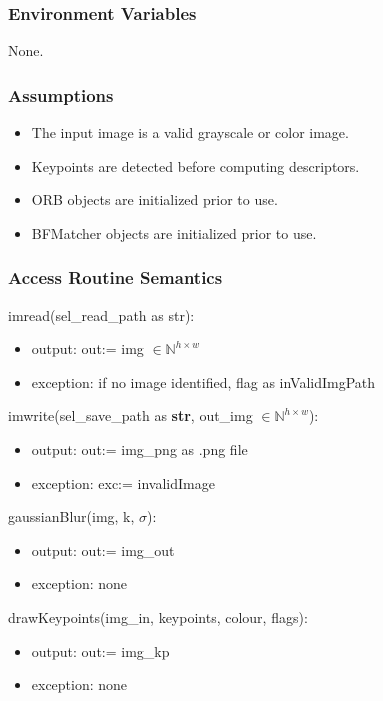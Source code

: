 \documentclass[12pt, titlepage]{article}
\begin{document}
\subsubsection{Environment Variables}
None.

\subsubsection{Assumptions}
\begin{itemize}
    \item The input image is a valid grayscale or color image.
    \item Keypoints are detected before computing descriptors.
    \item ORB objects are initialized prior to use.
    \item BFMatcher objects are initialized prior to use.
\end{itemize}

\subsubsection{Access Routine Semantics}

\noindent imread(sel\_read\_path as str):
\begin{itemize}
\item output: out:= img $\in \mathbb{N}^{h \times w}$
\item exception: if no image identified, flag as inValidImgPath 
\end{itemize}

\noindent imwrite(sel\_save\_path as \textbf{str}, out\_img 
$\in \mathbb{N}^{h \times w}$):
\begin{itemize}
\item output: out:= img\_png as .png file
\item exception: exc:= invalidImage
\end{itemize}

\noindent gaussianBlur(img, k, $\sigma$):
\begin{itemize}
    \item output: out:= img\_out
    \item exception: none
\end{itemize}

\noindent drawKeypoints(img\_in, keypoints, colour, flags):
\begin{itemize}
\item output: out:= img\_kp 
\item exception: none
\end{itemize}
\end{document}

